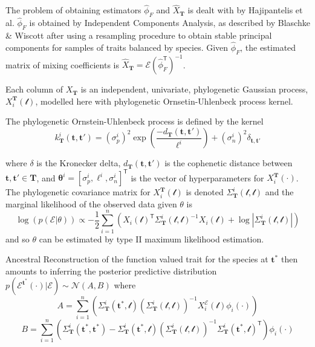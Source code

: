 \documentclass[wsdraft]{ws-rv9x6} %
\begin{document}
The problem of obtaining estimators \(\hat{\phi}_F\) and \(\hat{X}_{\mathbf{T}}\) is dealt with by Hajipantelis et al. \cite{hadjipantelis2013function} \(\hat{\phi}_F\) is obtained by Independent Components Analysis, as described by Blaschke \& Wiscott\cite{blaschke2004cubica} after using a resampling procedure to obtain stable principal components for samples of traits balanced by species. Given \(\hat{\phi}_F\), the estimated matrix of mixing coefficients is \(\hat{X}_{\mathbf{T}} = \mathcal{E} (\hat{\phi}_F^{\mathsf{T}})^{-1}\). 

Each column of \(X_{\mathbf{T}}\) is an independent, univariate, phylogenetic Gaussian process, \(X_i^{\mathbf{T}}(\mathcal{t})\), modelled here with phylogenetic Ornsetin-Uhlenbeck process kernel.

The phylogenetic Ornstein-Uhlenbeck process is defined by the kernel
\begin{equation}
k_{\mathbf{T}}^i(\mathbf{t}, \mathbf{t}') = (\sigma_p^i)^2 \exp \left( \frac{-d_{\mathbf{T}}(\mathbf{t}, \mathbf{t}')}{\ell^i} \right) + (\sigma_n^i)^2 \delta_{\mathbf{t}, \mathbf{t}'}
\label{eqn:oukernel}
\end{equation}

where \(\delta\) is the Kronecker delta, \(d_{\mathbf{T}}(\mathbf{t}, \mathbf{t}')\) is the cophenetic distance between \(\mathbf{t}, \mathbf{t}' \in \mathbf{T}\), and \(\mathbf{\theta}^i = [\sigma_p^i, \ell^i, \sigma_n^i]^{\mathsf{T}}\) is the vector of hyperparameters for \(X_i^{\mathbf{T}}(\cdot)\). The phylogenetic covariance matrix for \(X_i^{\mathbf{T}}(\mathcal{t})\) is denoted \(\Sigma_{\mathbf{T}}^i(\mathcal{t}, \mathcal{t})\) and the marginal likelihood of the observed data given \(\theta\) is
\begin{equation}
\log(p(\mathcal{E} | \theta)) \propto -\frac{1}{2} \sum_{i = 1}^{n} \left( X_i(\mathcal{t})^{\mathsf{T}} \Sigma_{\mathbf{T}}^i(\mathcal{t}, \mathcal{t})^{-1}  X_i(\mathcal{t}) + \log |\Sigma_{\mathbf{T}}^i(\mathcal{t}, \mathcal{t})|    \right)
\label{eqn:t2mle}
\end{equation}
and so \(\theta\) can be estimated by type II maximum likelihood estimation.

Ancestral Reconstruction of the function valued trait for the species at \(\mathbf{t}^*\) then amounts to inferring the posterior predictive distribution \(p(\mathcal{E}^{\mathbf{t}^*} (\cdot) | \mathcal{E}) \sim \mathcal{N}(A, B)\) where 
\begin{equation}
A = \sum_{i=1}^{n} \left( \Sigma_{\mathbf{T}}^i(\mathbf{t}^*, \mathcal{t}) \left( \Sigma_{\mathbf{T}}^i(\mathcal{t}, \mathcal{t})
\right)^{-1} X_i^{\mathcal{E}} (\mathcal{t}) \phi_i(\cdot) \right)
\end{equation}
\begin{equation}
B = \sum_{i=1}^{n}\left( \Sigma_{\mathbf{T}}^i(\mathbf{t}^*, \mathbf{t}^*) -  \Sigma_{\mathbf{T}}^i(\mathbf{t}^*, \mathcal{t}) \left( \Sigma_{\mathbf{T}}^i(\mathcal{t}, \mathcal{t})
\right)^{-1} \Sigma_{\mathbf{T}}^i(\mathbf{t}^*, \mathcal{t})^{\mathsf{T}} \right) \phi_i (\cdot)
\end{equation}
\end{document}

